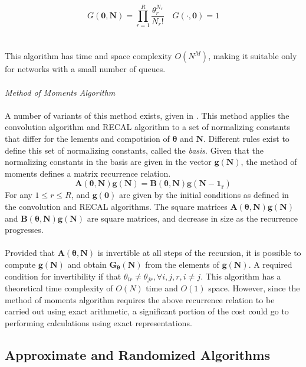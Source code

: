 \[G(\mathbf{0}, \mathbf{N}) = \prod_{r=1}^R \frac{\theta_r^{N_r}}{N_r!} \quad G(\cdot, \mathbf{0}) = 1 \]
\\\\
This algorithm has time and space complexity \(O(N^M)\), making it suitable only for networks with a small number of queues.
\\\\
\textit{{\large Method of Moments Algorithm}}\\\\
A number of variants of this method exists, given in \cite{Casale2011ANetworks, Casale2011ANetworksb, Casale2009CoMoM:Models}. This method applies the convolution algorithm and RECAL algorithm to a set of normalizing constants that differ for the lements and compotision of \(\boldsymbol{\theta}\) and \(\mathbf{N}\). Different rules exist to define this set of normalizing constants, called the \textit{basis}. Given that the normalizing constants in the basis are given in the vector \(\mathbf{g(N)}\), the method of moments defines a matrix recurrence relation.
\[\mathbf{A(\boldsymbol{\theta}, N)g(N)} = \mathbf{B(\boldsymbol{\theta}, N)g(N-1_r)}\]
For any \(1 \leq r \leq R\), and \(\mathbf{g(0)}\) are given by the initial conditions as defined in the convolution and RECAL algorithms. The square matrices \(\mathbf{A(\boldsymbol{\theta}, N)g(N)}\) and \(\mathbf{B(\boldsymbol{\theta}, N)g(N)}\) are square matrices, and decrease in size as the recurrence progresses. 
\\\\
Provided that \(\mathbf{A(\boldsymbol{\theta}, N)}\) is invertible at all steps of the recursion, it is possible to compute \(\mathbf{g(N)}\) and obtain \(\mathbf{G_{\boldsymbol{\theta}}(N)}\) from the elements of \(\mathbf{g(N)}\). A required condition for invertibility if that \(\theta_{ir} \neq \theta_{jr}, \forall i,j,r, i \neq j\). This algorithm has a theoretical time complexity of \(O(N)\) time and \(O(1)\) space. However, since the method of moments algorithm requires the above recurrence relation to be carried out using exact arithmetic, a significant portion of the cost could go to performing calculations using exact representations.

\subsection{Approximate and Randomized Algorithms} \label{sec:approx_algos}

